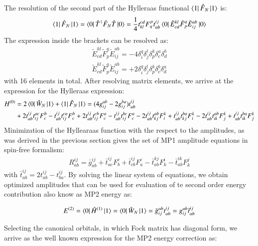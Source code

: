 \documentclass[journal=jacsat]{achemso}
\numberwithin{equation}{section}
\begin{document}
The resolution of the second part of the Hylleraas functional $\bra{1}\hat{F}_{N}\ket{1}$ is:
\begin{align}
\bra{1}\hat{F}_{N}\ket{1}=\bra{0}\hat{T}^{\dagger}\hat{F}_{N}\hat{T}\ket{0}=\frac{1}{4}t^{cd}_{kl}F^{p}_{q}t^{ij}_{ab}\bra{0}\tilde{E}^{kl}_{cd}\tilde{F}^{q}_{p}\tilde{E}^{ab}_{ij}\ket{0}
\end{align}
The expression inside the brackets can be resolved as:
\begin{align}
\tilde{E}^{kl}_{cd}\tilde{F}^{q}_{p}\tilde{E}^{ab}_{ij}=-4\delta^{q}_{i}\delta^{l}_{j}\delta^{k}_{p}\delta^{a}_{c}\delta^{b}_{d}\\
\tilde{E}^{kl}_{cd}\tilde{F}^{q}_{p}\tilde{E}^{ab}_{ij}=+2\delta^{q}_{i}\delta^{l}_{j}\delta^{k}_{p}\delta^{b}_{c}\delta^{a}_{d}
\end{align}
with 16 elements in total. After resolving matrix elements, we arrive at the expression for the Hylleraas expression:
\begin{align}
H^{(0)}&=2\bra{0}\hat{W}_{N}\ket{1}+\bra{1}\hat{F}_{N}\ket{1}=(4g^{ab}_{ij}-2g^{ba}_{ij})t^{ij}_{ab}\\\nonumber
&+2t^{ij}_{ab}t^{ac}_{ij}F^{b}_{c}-t^{ij}_{ab}t^{ca}_{ij}F^{b}_{c}+2t^{ij}_{ab}t^{cb}_{ij}F^{a}_{c}-t^{ij}_{ab}t^{bc}_{ij}F^{a}_{c}-2t^{ij}_{ab}t^{ab}_{kj}F^{k}_{i}+t^{ij}_{ab}t^{ba}_{kj}F^{k}_{i}-2t^{ij}_{ab}t^{ab}_{ik}F^{k}_{j}+t^{ij}_{ab}t^{ba}_{ik}F^{k}_{j}
\end{align}
Minimization of the Hyllearaas function with the respect to the amplitudes, as was derived in the previous section gives the set of MP1 amplitude equations in spin-free formalism:
\begin{align}
R^{ij}_{ab}=\bar{g}^{ij}_{ab}
+\bar{t}^{ij}_{ac}F^{c}_{b}+\bar{t}^{ij}_{cb}F^{c}_{a}-\bar{t}^{kj}_{ab}F^{i}_{k}-\bar{t}^{ik}_{ab}F^{j}_{k}
\end{align}
with $\bar{t}^{ij}_{ab}=2t^{ij}_{ab}-t^{ij}_{ba}$. By solving the linear system of equations, we obtain optimized amplitudes that can be used for evaluation of te second order energy contribution also know as MP2 energy as:

\begin{align}
E^{(2)}=\bra{0}\hat{H}^{(1)}\ket{1}=\bra{0}\hat{W}_{N}\ket{1}=\bar{g}^{ab}_{ij}t^{ij}_{ab}=g^{ab}_{ij}\bar{t}^{ij}_{ab}
\end{align} 

Selecting the canonical orbitals, in which Fock matrix has diagonal form, we arrive as the well known expression for the MP2 energy correction as:
\end{document}
